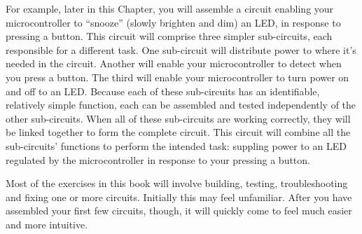 For example, later in this Chapter, you will assemble a circuit enabling your microcontroller to ``snooze'' (slowly brighten and dim) an LED, in response to pressing a button.
This circuit will comprise three  simpler sub-circuits, each responsible for a different task.
One sub-circuit will distribute power to where it's needed in the circuit.
Another will enable your microcontroller to detect when you press a button.
The third will enable your microcontroller to turn power on and off to an LED.
Because each of these sub-circuits has an identifiable, relatively simple function, each can be assembled and tested independently of the other sub-circuits.
When all of these sub-circuits are working correctly, they will be linked together to form the complete circuit.
This circuit will combine all the sub-circuits' functions to perform the intended task: suppling power to an LED regulated by the microcontroller in response to your pressing a button.

Most of the exercises in this book will involve building, testing, troubleshooting and fixing one or more circuits.
Initially this may feel unfamiliar.
After you have assembled your first few circuits, though, it will quickly come to feel much easier and more intuitive.


